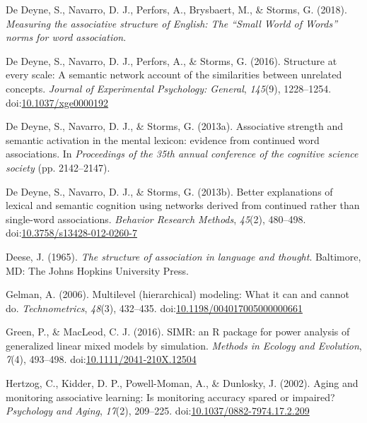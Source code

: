 \documentclass[english,,man]{apa6}
\begin{document}
\leavevmode\hypertarget{ref-DeDeyne2018}{}%
De Deyne, S., Navarro, D. J., Perfors, A., Brysbaert, M., \& Storms, G. (2018). \emph{Measuring the associative structure of English: The ``Small World of Words'' norms for word association}.

\leavevmode\hypertarget{ref-DeDeyne2016}{}%
De Deyne, S., Navarro, D. J., Perfors, A., \& Storms, G. (2016). Structure at every scale: A semantic network account of the similarities between unrelated concepts. \emph{Journal of Experimental Psychology: General}, \emph{145}(9), 1228--1254. doi:\href{https://doi.org/10.1037/xge0000192}{10.1037/xge0000192}

\leavevmode\hypertarget{ref-DeDeyne2013a}{}%
De Deyne, S., Navarro, D. J., \& Storms, G. (2013a). Associative strength and semantic activation in the mental lexicon: evidence from continued word associations. In \emph{Proceedings of the 35th annual conference of the cognitive science society} (pp. 2142--2147).

\leavevmode\hypertarget{ref-DeDeyne2013}{}%
De Deyne, S., Navarro, D. J., \& Storms, G. (2013b). Better explanations of lexical and semantic cognition using networks derived from continued rather than single-word associations. \emph{Behavior Research Methods}, \emph{45}(2), 480--498. doi:\href{https://doi.org/10.3758/s13428-012-0260-7}{10.3758/s13428-012-0260-7}

\leavevmode\hypertarget{ref-Deese1965}{}%
Deese, J. (1965). \emph{The structure of association in language and thought}. Baltimore, MD: The Johns Hopkins University Press.

\leavevmode\hypertarget{ref-Gelman2006}{}%
Gelman, A. (2006). Multilevel (hierarchical) modeling: What it can and cannot do. \emph{Technometrics}, \emph{48}(3), 432--435. doi:\href{https://doi.org/10.1198/004017005000000661}{10.1198/004017005000000661}

\leavevmode\hypertarget{ref-Green2016}{}%
Green, P., \& MacLeod, C. J. (2016). SIMR: an R package for power analysis of generalized linear mixed models by simulation. \emph{Methods in Ecology and Evolution}, \emph{7}(4), 493--498. doi:\href{https://doi.org/10.1111/2041-210X.12504}{10.1111/2041-210X.12504}

\leavevmode\hypertarget{ref-Hertzog2002}{}%
Hertzog, C., Kidder, D. P., Powell-Moman, A., \& Dunlosky, J. (2002). Aging and monitoring associative learning: Is monitoring accuracy spared or impaired? \emph{Psychology and Aging}, \emph{17}(2), 209--225. doi:\href{https://doi.org/10.1037/0882-7974.17.2.209}{10.1037/0882-7974.17.2.209}
\end{document}
